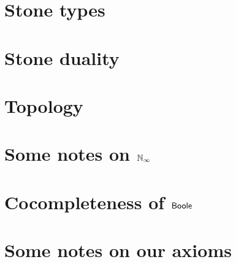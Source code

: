 \documentclass{../util/zariski}
\begin{document}
\section{Stone types}


\section{Stone duality}




\section{Topology}








%




\appendix
\section{Some notes on $\mathbb{N}_{\infty}$}


\section{Cocompleteness of $\mathsf{Boole}$}

\section{Some notes on our axioms}
\label{NotesOnAxioms}


%
\end{document}
